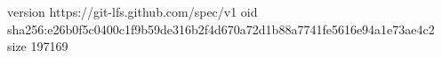 version https://git-lfs.github.com/spec/v1
oid sha256:e26b0f5c0400c1f9b59de316b2f4d670a72d1b88a7741fe5616e94a1e73ae4c2
size 197169
